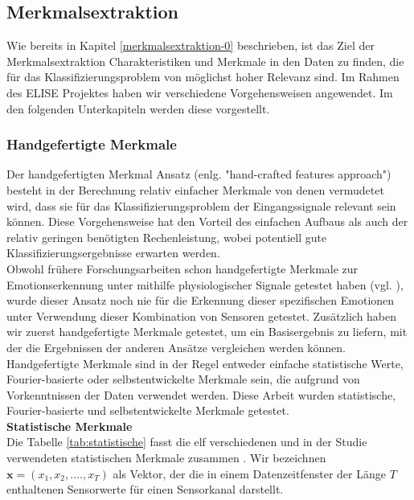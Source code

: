 \subsection{Merkmalsextraktion} \label{merkmalsextraftion-1}


Wie bereits in Kapitel \ref{merkmalsextraktion-0} beschrieben, ist das Ziel der Merkmalsextraktion Charakteristiken und Merkmale in den Daten zu finden, die f{\"u}r das
Klassifizierungsproblem von m{\"o}glichst hoher Relevanz sind. Im Rahmen des ELISE Projektes haben wir verschiedene Vorgehensweisen angewendet. Im den folgenden Unterkapiteln werden diese vorgestellt. \\


\subsubsection{Handgefertigte Merkmale} \label{hc-features-1}
Der handgefertigten Merkmal Ansatz (enlg. "hand-crafted features approach") besteht in der Berechnung relativ einfacher Merkmale von denen vermudetet wird, dass sie f{\"u}r das Klassifizierungsproblem der Eingangssignale relevant sein k{\"o}nnen. Diese Vorgehensweise hat den Vorteil des einfachen Aufbaus als auch der relativ geringen ben{\"o}tigten Rechenleistung, wobei potentiell gute Klassifizierungsergebnisse erwarten werden. \\


Obwohl fr{\"u}here Forschungsarbeiten schon handgefertigte Merkmale zur Emotionserkennung unter mithilfe physiologischer Signale getestet haben (vgl. \cite{martinez_ieee_2013}), wurde dieser Ansatz noch nie f{\"u}r die Erkennung dieser spezifischen Emotionen unter Verwendung dieser Kombination von Sensoren getestet.
Zus{\"a}tzlich haben wir zuerst handgefertigte Merkmale getestet, um ein Basisergebnis zu liefern, mit der die Ergebnissen der anderen Ans{\"a}tze vergleichen werden k{\"o}nnen.
Handgefertigte Merkmale sind in der Regel entweder einfache statistische Werte, Fourier-basierte oder selbstentwickelte Merkmale sein, die aufgrund von Vorkenntnissen der Daten verwendet werden. 
Diese Arbeit wurden statistische, Fourier-basierte und selbstentwickelte Merkmale getestet. \\

\textbf{Statistische Merkmale \\}
Die Tabelle \ref{tab:statistische} fasst die elf verschiedenen und in der Studie verwendeten statistischen Merkmale zusammen \cite{bscpiet}. Wir bezeichnen $\mathbf{x} = (x_1, x_2, ...., x_T) $ als Vektor, der die in einem Datenzeitfenster der L{\"a}nge $T$ enthaltenen Sensorwerte f{\"u}r einen Sensorkanal darstellt. 


